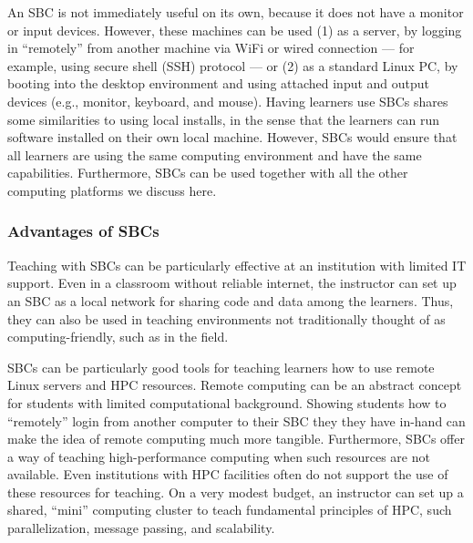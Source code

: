 An SBC is not immediately useful on its own, because it does not have a monitor
or input devices.
However, these machines can be used
(1) as a server, by logging in ``remotely'' from another machine via WiFi or
wired connection --- for example, using secure shell (SSH) protocol ---
or
(2) as a standard Linux PC, by booting into the desktop environment and using
attached input and output devices (e.g., monitor, keyboard, and mouse).
Having learners use SBCs shares some similarities to using local
installs, in the sense that the learners can run software installed on their
own local machine.
However, SBCs would ensure that all learners are using the same
computing environment and have the same capabilities.
Furthermore, SBCs can be used together with all the other computing platforms we
discuss here.

\subsubsection{Advantages of SBCs}

Teaching with SBCs can be particularly effective at an institution with limited
IT support.
Even in a classroom without reliable internet, the instructor can set up an SBC
as a local network for sharing code and data among the learners.
Thus, they can also be used in teaching environments not traditionally thought
of as computing-friendly, such as in the field.

SBCs can be particularly good tools for teaching learners how
to use remote Linux servers and HPC resources.
Remote computing can be an abstract concept for students with limited
computational background.
Showing students how to ``remotely'' login from another computer to their SBC
they they have in-hand can make the idea of remote computing much more
tangible.
Furthermore, SBCs offer a way of teaching high-performance
computing when such resources are not available.
Even institutions with HPC facilities often do not support the use of these
resources for teaching.
On a very modest budget, an instructor can set up a shared, ``mini''
computing cluster to teach fundamental principles of HPC, such parallelization,
message passing, and scalability.

